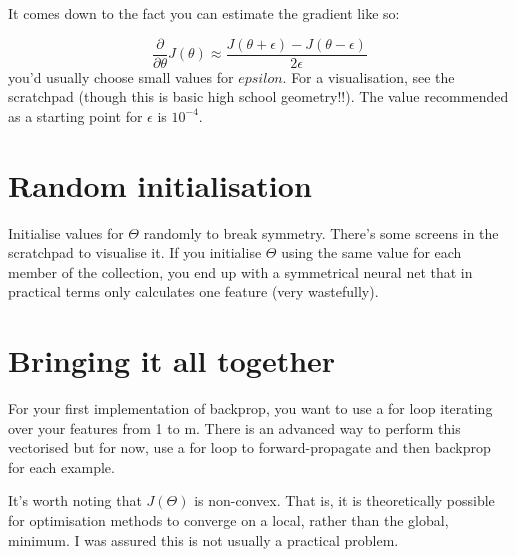It comes down to the fact you can estimate the gradient like so:

\begin{equation}
\frac{\partial}{\partial\theta}J(\theta) \approx
\frac{J(\theta + \epsilon) - J(\theta - \epsilon)}{2\epsilon}
\end{equation}
you'd usually choose small values for $epsilon$. For a visualisation, see the scratchpad (though this is basic high school geometry!!). The value recommended as a starting point for $\epsilon$ is $10^{-4}$.

\section{Random initialisation}

Initialise values for $\Theta$ randomly to break symmetry. There's some screens in the scratchpad to visualise it. If you initialise $\Theta$ using the same value for each member of the collection, you end up with a symmetrical neural net that in practical terms only calculates one feature (very wastefully).

\section{Bringing it all together}

For your first implementation of backprop, you want to use a for loop iterating over your features from 1 to m. There is an advanced way to perform this vectorised but for now, use a for loop to forward-propagate and then backprop for each example.

It's worth noting that $J(\Theta)$ is non-convex. That is, it is theoretically possible for optimisation methods to converge on a local, rather than the global, minimum. I was assured this is not usually a practical problem.